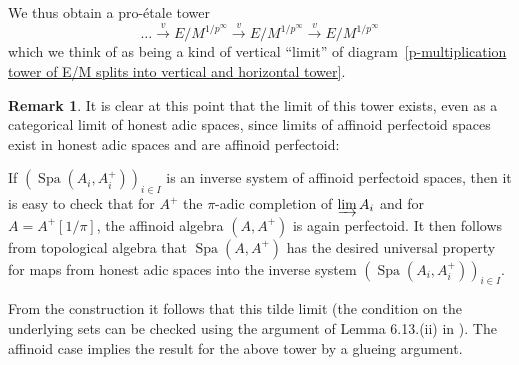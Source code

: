 \documentclass[10pt,oneside]{amsart}
\theoremstyle{definition}
\newtheorem{remark}[theorem]{Remark}
\begin{document}
	We thus obtain a pro-\'etale tower
	\begin{equation}\label{proetale tower in the vertical limit}
	\dots \xrightarrow{v}E/M^{1/p^\infty}\xrightarrow{v} E/M^{1/p^\infty}\xrightarrow{v} E/M^{1/p^\infty}
	\end{equation}
	which we think of as being a kind of vertical ``limit'' of diagram~\ref{p-multiplication tower of E/M splits into vertical and horizontal tower}. 
	\begin{remark}\label{projective limits of perfectoid spaces as adic spaces}
	It is clear at this point that the limit of this tower exists, even as a categorical limit of honest adic spaces, since limits of affinoid perfectoid spaces exist in honest adic spaces and are affinoid perfectoid:
	
	If $(\operatorname{Spa}(A_i,A_i^{+}))_{i\in I}$ is an inverse system of affinoid perfectoid spaces, then it is easy to check that for $A^+$ the $\pi$-adic completion of $\varinjlim A_i$ and for $A = A^+[1/\pi]$, the affinoid algebra $(A,A^{+})$ is again perfectoid. It then follows from topological algebra that $\operatorname {Spa}(A,A^{+})$ has the desired universal property for maps from honest adic spaces into the inverse system $(\operatorname{Spa}(A_i,A_i^{+}))_{i\in I}$.
	
	From the construction it follows that this tilde limit (the condition on the underlying sets can be checked using the argument of Lemma 6.13.(ii) in \cite{perfectoid}). The affinoid case implies the result for the above tower by a glueing argument.
	\end{remark}
	
\end{document}
